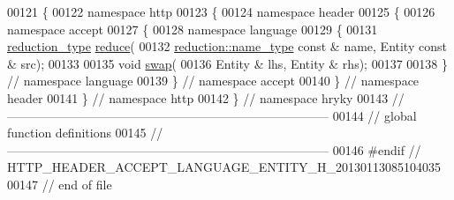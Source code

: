 \begin{DoxyCode}
00121 \{
00122 \textcolor{keyword}{namespace }http
00123 \{
00124 \textcolor{keyword}{namespace }header
00125 \{
00126 \textcolor{keyword}{namespace }accept
00127 \{
00128 \textcolor{keyword}{namespace }language
00129 \{
00131     \hyperlink{namespacehryky_a343a9a4c36a586be5c2693156200eadc}{reduction_type} \hyperlink{namespacehryky_1_1http_a08fc36a78a8e2908140fcd102829a566}{reduce}(
00132         \hyperlink{namespacehryky_1_1reduction_ac686c30a4c8d196bbd0f05629a6b921f}{reduction::name_type} \textcolor{keyword}{const} & name, Entity \textcolor{keyword}{const} & src);
00133 
00135     \textcolor{keywordtype}{void} \hyperlink{namespacehryky_1_1http_a38e62595ad532d18fbc65ceb61973aec}{swap}(
00136         Entity & lhs, Entity & rhs);
00137 
00138 \} \textcolor{comment}{// namespace language}
00139 \} \textcolor{comment}{// namespace accept}
00140 \} \textcolor{comment}{// namespace header}
00141 \} \textcolor{comment}{// namespace http}
00142 \} \textcolor{comment}{// namespace hryky}
00143 \textcolor{comment}{//
      ------------------------------------------------------------------------------}
00144 \textcolor{comment}{// global function definitions}
00145 \textcolor{comment}{//
      ------------------------------------------------------------------------------}
00146 \textcolor{preprocessor}{#endif // HTTP\_HEADER\_ACCEPT\_LANGUAGE\_ENTITY\_H\_20130113085104035}
00147 \textcolor{preprocessor}{}\textcolor{comment}{// end of file}
\end{DoxyCode}
